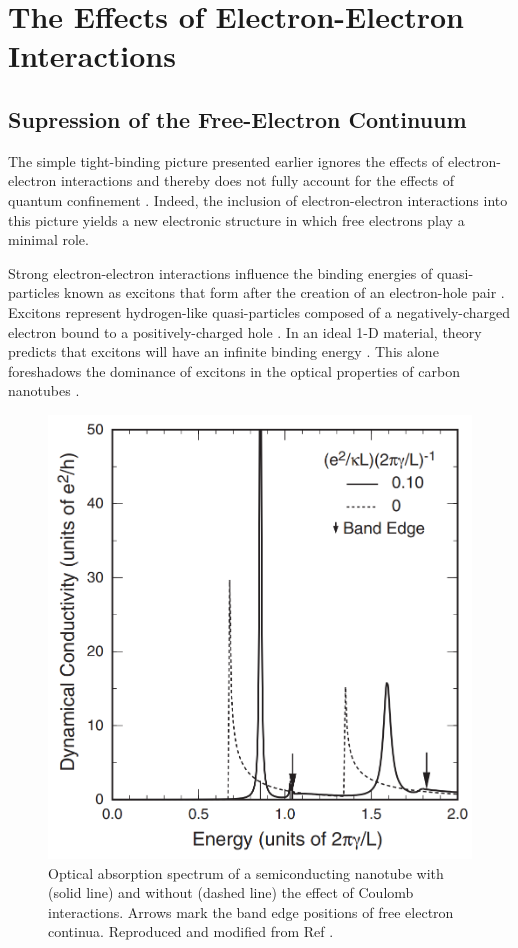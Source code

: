  
\section{The Effects of Electron-Electron Interactions}
\subsection{Supression of the Free-Electron Continuum}
The simple tight-binding picture presented earlier ignores the effects of electron-electron interactions and thereby does not fully account for the effects of quantum confinement \cite{weismanKonoBook}. Indeed, the inclusion of electron-electron interactions into this picture yields a new electronic structure in which free electrons play a minimal role.

Strong electron-electron interactions influence the binding energies of quasi-particles known as excitons that form after the creation of an electron-hole pair \cite{koch2006semiconductor}. Excitons represent hydrogen-like quasi-particles composed of a negatively-charged electron bound to a positively-charged hole \cite{koch2006semiconductor}. In an ideal 1-D material, theory predicts that excitons will have an infinite binding energy \cite{ando2005theory}. This alone foreshadows the dominance of excitons in the optical properties of carbon nanotubes \cite{ando2005theory}. 

\begin{figure}[h]
	\centering
	\includegraphics[scale=0.35]{images/chapter_optical_props/ando_suppression}
	\caption{Optical absorption spectrum of a semiconducting nanotube with (solid line) and without (dashed line) the effect of Coulomb interactions. Arrows mark the band edge positions of free electron continua. Reproduced and modified from Ref \cite{ando2005theory}.}
	\label{fig:ando_suppression}
\end{figure}

